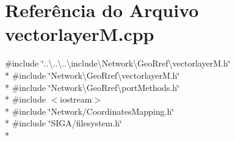 \section{Referência do Arquivo vectorlayer\+M.\+cpp}
\label{vectorlayer_m_8cpp}
{\ttfamily \#include \char`\"{}..\textbackslash{}..\textbackslash{}..\textbackslash{}include\textbackslash{}\+Network\textbackslash{}\+Geo\+Rref\textbackslash{}vectorlayer\+M.\+h\char`\"{}}\\*
{\ttfamily \#include \char`\"{}Network\textbackslash{}\+Geo\+Rref\textbackslash{}vectorlayer\+M.\+h\char`\"{}}\\*
{\ttfamily \#include \char`\"{}Network\textbackslash{}\+Geo\+Rref\textbackslash{}port\+Methods.\+h\char`\"{}}\\*
{\ttfamily \#include $<$iostream$>$}\\*
{\ttfamily \#include \char`\"{}Network/\+Coordinates\+Mapping.\+h\char`\"{}}\\*
{\ttfamily \#include \char`\"{}S\+I\+G\+A/filesystem.\+h\char`\"{}}\\*
